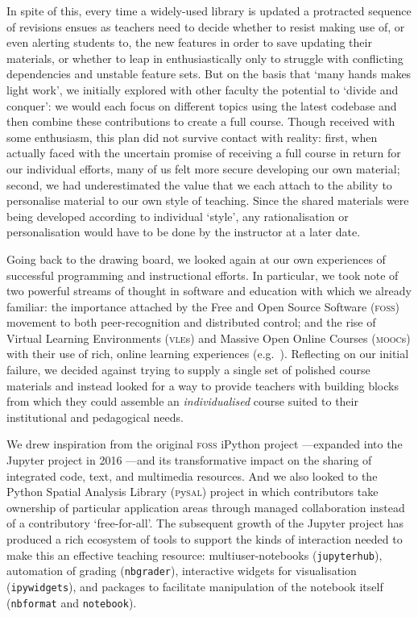 \documentclass[letter, 11pt,titlepage]{article}
\newcommand{\eg}{e.g.~\/}
\begin{document}
In spite of this, every time a widely-used library is updated a protracted sequence of revisions ensues as teachers need to decide whether to resist making use of, or even alerting students to, the new features in order to save updating their materials, or whether to leap in enthusiastically only to struggle with conflicting dependencies and unstable feature sets. But on the basis that `many hands makes light work', we initially explored with other faculty the potential to `divide and conquer': we would each focus on different topics using the latest codebase and then combine these contributions to create a full course. Though received with some enthusiasm, this plan did not survive contact with reality: first, when actually faced with the uncertain promise of receiving a full course in return for our individual efforts, many of us felt more secure developing our own material; second, we had underestimated the value that we each attach to the ability to personalise material to our own style of teaching. Since the shared materials were being developed according to individual `style', any rationalisation or personalisation would have to be done by the instructor at a later date.

Going back to the drawing board, we looked again at our own experiences of successful programming and instructional efforts. In particular, we took note of two powerful streams of thought in software and education with which we already familiar: the importance attached by the Free and Open Source Software (\textsc{foss}) movement to both peer-recognition \citep{raymond_cathedral_1999} and distributed control; and the rise of Virtual Learning Environments (\textsc{vle}s) and Massive Open Online Courses (\textsc{mooc}s) with their use of rich, online learning experiences (\eg \citealp{Trafford2011,Cabiria2012}). Reflecting on our initial failure, we decided against trying to supply a single set of polished course materials and instead looked for a way to provide teachers with building blocks from which they could assemble an \emph{individualised} course suited to their institutional and pedagogical needs.

We drew inspiration from the original \textsc{foss} iPython project \citep{perez_2007_ipython}---expanded into the Jupyter project in 2016 \citep{kluyver16}---and its transformative impact on the sharing of integrated code, text, and multimedia resources. And we also looked to the Python Spatial Analysis Library (\textsc{p}y\textsc{sal}) project \citep{rey_19sea} in which contributors take ownership of particular application areas through managed collaboration instead of a contributory `free-for-all'. The subsequent growth of the Jupyter project has produced a rich ecosystem of tools to support the kinds of interaction needed to make this an effective teaching resource: multiuser-notebooks (\texttt{jupyterhub}), automation of grading (\texttt{nbgrader}), interactive widgets for visualisation (\texttt{ipywidgets}), and packages to facilitate manipulation of the notebook itself (\texttt{nbformat} and \texttt{notebook}).
\end{document}
